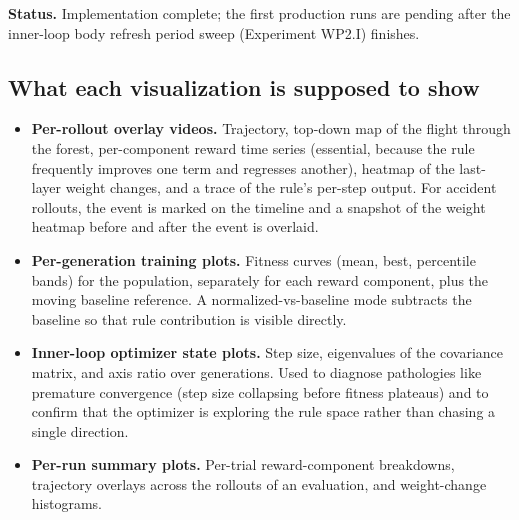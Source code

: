 \documentclass[letterpaper,10pt]{article}
\begin{document}
\textbf{Status.} Implementation complete; the first production runs are pending after the inner-loop body refresh period sweep (Experiment WP2.I) finishes.

\subsection{What each visualization is supposed to show}

\begin{itemize}
    \item \textbf{Per-rollout overlay videos.} Trajectory, top-down map of the flight through the forest, per-component reward time series (essential, because the rule frequently improves one term and regresses another), heatmap of the last-layer weight changes, and a trace of the rule's per-step output. For accident rollouts, the event is marked on the timeline and a snapshot of the weight heatmap before and after the event is overlaid.
    \item \textbf{Per-generation training plots.} Fitness curves (mean, best, percentile bands) for the population, separately for each reward component, plus the moving baseline reference. A normalized-vs-baseline mode subtracts the baseline so that rule contribution is visible directly.
    \item \textbf{Inner-loop optimizer state plots.} Step size, eigenvalues of the covariance matrix, and axis ratio over generations. Used to diagnose pathologies like premature convergence (step size collapsing before fitness plateaus) and to confirm that the optimizer is exploring the rule space rather than chasing a single direction.
    \item \textbf{Per-run summary plots.} Per-trial reward-component breakdowns, trajectory overlays across the rollouts of an evaluation, and weight-change histograms.
\end{itemize}
\end{document}
